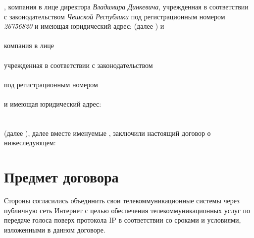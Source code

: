 \begin{Form}
   \textbf{\ipxpname}, компания в лице директора \textit{Владимира Динкевича},
   учрежденная в соответствии с законодательством \textit{Чешской Республики} под регистрационным
   номером \textit{26756820} и имеющая юридический адрес: \textit{\ipxpaddress} (далее \textbf{\frqq})
   и
   \\[\medskipamount]
   \MyTextField{}{\underline{\TextField[name=clntname,charsize=10pt,width=\fieldlength,height=1em,borderwidth=0, bordercolor={1 1 1}, default=Company name]{}},}
   \\[\medskipamount]
   компания в лице\\
   \MyTextField{}{\underline{\TextField[name=clntdirname,charsize=10pt,width=\fieldlength,height=1em,borderwidth=0,bordercolor={1 1 1}, default=Director's name]{}},}
   \\[\medskipamount]
   учрежденная в соответствии с законодательством\\
   \MyTextField{}{\underline{\TextField[name=clntcountry,charsize=10pt,width=\fieldlength,height=1em,borderwidth=0, bordercolor={1 1 1}, default=Country]{}}}
   \\[\medskipamount]
   под регистрационным номером\\
   \MyTextField{}{\underline{\TextField[name=clntregnum,charsize=10pt,width=\fieldlength,height=1em,borderwidth=0, bordercolor={1 1 1}, default=Registration number]{}}}
   \\[\medskipamount]
   и имеющая юридический адрес:\\
   \MyTextField{}{\underline{\TextField[name=clntlegaladdr,charsize=10pt,width=\fieldlength,height=1em,borderwidth=0,bordercolor={1 1 1}, default=Legal address]{}}}
   \\[\medskipamount]
   \MyTextField{}{\underline{\TextField[name=clntlegaladdrnext,charsize=10pt,width=\fieldlength,height=1em,borderwidth=0,bordercolor={1 1 1}]{}}}
   \\[\medskipamount]
   (далее \textbf{\frqq}), далее вместе именуемые \textbf{\frqq}, заключили
   настоящий договор о нижеследующем:

   \section*{Предмет договора}
   Стороны  согласились объединить свои телекоммуникационные системы через публичную сеть Интернет с целью обеспечения
   телекоммуникационных услуг по передаче голоса поверх протокола IP в соответствии со сроками и условиями,
   изложенными в данном договоре.


\end{Form}
